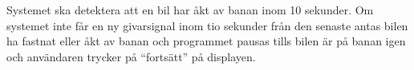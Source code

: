 Systemet ska detektera att en bil har åkt av banan inom 10 sekunder. Om systemet
inte får en ny givarsignal inom tio sekunder från den senaste antas bilen ha
fastnat eller åkt av banan och programmet pausas tills bilen är på banan igen
och användaren trycker på ``fortsätt'' på displayen.

